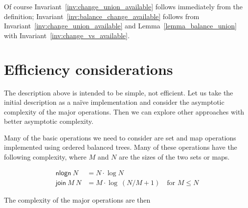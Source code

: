 \documentclass{article}
\begin{document}
Of course Invariant~\ref{inv:change_union_available} follows immediately from
the definition; Invariant~\ref{inv:balance_change_available} follows from
Invariant~\ref{inv:change_union_available} and Lemma~\ref{lemma_balance_union}
with Invariant~\ref{inv:change_vs_available}.

\section{Efficiency considerations}

The description above is intended to be simple, not efficient. Let us take the
initial description as a na\"ive implementation and consider the asymptotic
complexity of the major operations. Then we can explore other approaches with
better asymptotic complexity.

Many of the basic operations we need to consider are set and map operations
implemented using ordered balanced trees. Many of these operations have the
following complexity, where $M$ and $N$ are the sizes of the two sets or maps.

\begin{equation*}
\begin{split}
\mathsf{nlogn} ~ N & = N \cdot \log N \\
\mathsf{join} ~ M ~ N & = M \cdot \log ~ (N/M + 1) \quad \text{for } M \leq N
\end{split}
\end{equation*}

The complexity of the major operations are then
\end{document}
